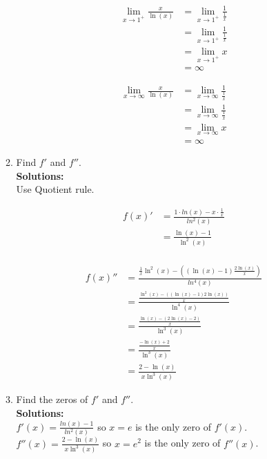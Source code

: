 \documentclass[a4paper]{article}
\begin{document}
\begin{enumerate}
\begin{enumerate}
		\begin{align*}
		\lim_{x \to 1^+} \frac{x}{\ln(x)} &= \lim_{x \to 1^+} \frac{1}{\frac{1}{x}}\\
		&= \lim_{x \to 1^+} \frac{1}{\frac{1}{x}}\\
		&= \lim_{x \to 1^+} x\\
		&= \infty
	\end{align*}
	
			\begin{align*}
		\lim_{x \to \infty} \frac{x}{\ln(x)} &= \lim_{x \to \infty} \frac{1}{\frac{1}{x}}\\
		&= \lim_{x \to \infty} \frac{1}{\frac{1}{x}}\\
		&= \lim_{x \to \infty} x\\
		&= \infty
	\end{align*}


	\item Find $f'$ and $f''$.\\
	\textbf{Solutions:}\\

Use Quotient rule.

	\begin{align*}
		f(x)' &= \frac{1 \cdot ln(x) - x \cdot \frac{1}{x}}{ln^2(x)}\\
		&= \frac{\ln(x) - 1}{\ln^2(x)}\\
	\end{align*}
	
	\begin{align*}
		f(x)'' &= \frac{\frac{1}{x} \ln^2(x) - ((\ln(x) - 1) \frac{2\ln(x)}{x})}{ln^4(x)}\\
		&= \frac{\frac{\ln^2(x) - ((\ln(x) - 1)2\ln(x))}{x}}{\ln^4(x)}\\
		&= \frac{\frac{\ln(x) - (2\ln(x) - 2)}{x}}{\ln^3(x)}\\
		&= \frac{\frac{-\ln(x) + 2}{x}}{\ln^3(x)}\\
		&= \frac{2 - \ln(x)}{x \ln^3(x)}
	\end{align*}


	
	\item Find the zeros of $f'$ and $f''$.\\
	\textbf{Solutions:}\\
	
$f'(x) = \frac{ln(x) - 1}{ln^2(x)}$ so $x = e$ is the only zero of $f'(x)$.\\
$f''(x) = \frac{2 - \ln(x)}{x \ln^3(x)}$ so $x = e^2$ is the only zero of $f''(x)$.\\		
	

\end{enumerate}
\end{enumerate}
\end{document}
